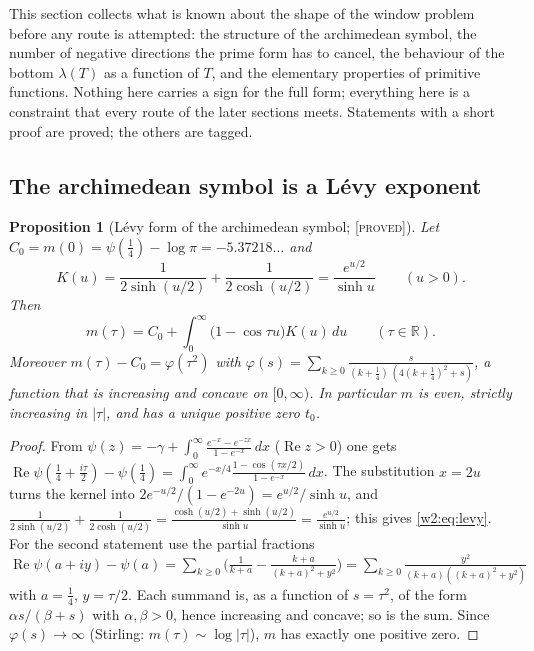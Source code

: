 \documentclass[11pt]{amsart}
\newtheorem{proposition}[theorem]{Proposition}
\theoremstyle{definition}
\theoremstyle{remark}
\numberwithin{equation}{section}
\newcommand{\R}{\mathbb{R}}
\DeclareMathOperator{\Rel}{Re}
\newcommand{\lam}{\lambda(T)}                          %
\newcommand{\stag}[1]{\textsc{[#1]}}
\newcommand{\PROVED}{\stag{proved}}
\begin{document}
This section collects what is known about the shape of the window problem before any route is attempted: the
structure of the archimedean symbol, the number of negative directions the prime form has to cancel, the behaviour of
the bottom $\lam$ as a function of $T$, and the elementary properties of primitive functions. Nothing here carries a
sign for the full form; everything here is a constraint that every route of the later sections meets. Statements with a
short proof are proved; the others are tagged.

\subsection{The archimedean symbol is a L\'evy exponent}

\begin{proposition}[L\'evy form of the archimedean symbol; \PROVED]\label{w2:prop:levy}
Let $C_0=m(0)=\psi(\frac14)-\log\pi=-5.37218\ldots$ and
\[
K(u)=\frac{1}{2\sinh(u/2)}+\frac{1}{2\cosh(u/2)}=\frac{e^{u/2}}{\sinh u}\qquad(u>0).
\]
Then
\begin{equation}\label{w2:eq:levy}
m(\tau)=C_0+\int_0^\infty\bigl(1-\cos\tau u\bigr)K(u)\,du\qquad(\tau\in\R).
\end{equation}
Moreover $m(\tau)-C_0=\varphi(\tau^2)$ with
$\varphi(s)=\sum_{k\ge0}\frac{s}{(k+\frac14)\,(4(k+\frac14)^2+s)}$, a function that is increasing and concave on
$[0,\infty)$. In particular $m$ is even, strictly increasing in $|\tau|$, and has a unique positive zero $t_0$.
\end{proposition}

\begin{proof}
From $\psi(z)=-\gamma+\int_0^\infty\frac{e^{-x}-e^{-zx}}{1-e^{-x}}\,dx$ ($\Rel z>0$) one gets
$\Rel\psi(\frac14+\frac{i\tau}2)-\psi(\frac14)=\int_0^\infty e^{-x/4}\frac{1-\cos(\tau x/2)}{1-e^{-x}}\,dx$. The
substitution $x=2u$ turns the kernel into $2e^{-u/2}/(1-e^{-2u})=e^{u/2}/\sinh u$, and
$\frac{1}{2\sinh(u/2)}+\frac1{2\cosh(u/2)}=\frac{\cosh(u/2)+\sinh(u/2)}{\sinh u}=\frac{e^{u/2}}{\sinh u}$; this gives
\eqref{w2:eq:levy}. For the second statement use the partial fractions
$\Rel\psi(a+iy)-\psi(a)=\sum_{k\ge0}\bigl(\frac1{k+a}-\frac{k+a}{(k+a)^2+y^2}\bigr)
=\sum_{k\ge0}\frac{y^2}{(k+a)((k+a)^2+y^2)}$ with $a=\frac14$, $y=\tau/2$. Each summand is, as a function of
$s=\tau^2$, of the form $\alpha s/(\beta+s)$ with $\alpha,\beta>0$, hence increasing and concave; so is the sum.
Since $\varphi(s)\to\infty$ (Stirling: $m(\tau)\sim\log|\tau|$), $m$ has exactly one positive zero.
\end{proof}
\end{document}
